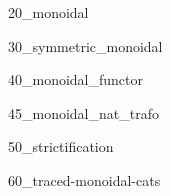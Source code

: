 

\label{chap:monoidal}

{20_monoidal}

{30_symmetric_monoidal}

{40_monoidal_functor}

{45_monoidal_nat_trafo}

{50_strictification}

{60_traced-monoidal-cats}


